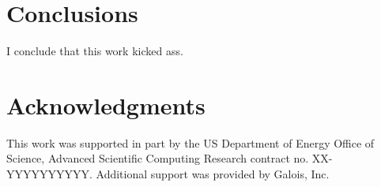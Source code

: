 \documentclass{acm_proc_article-sp}
\begin{document}
\section{Conclusions}

I conclude that this work kicked ass.

\section{Acknowledgments}

This work was supported in part by the US Department of
Energy Office of Science, Advanced Scientific Computing Research
contract no. XX-YYYYYYYYYY.  Additional support was provided by Galois,
Inc.


\end{document}
